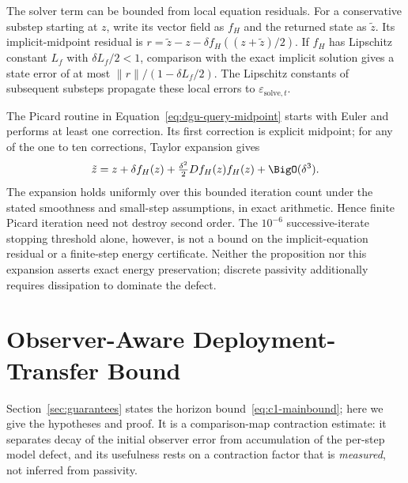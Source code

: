 The solver term can be bounded from local equation residuals. For a
conservative substep starting at $z$, write its vector field as $f_H$ and
the returned state as $\tilde z$. Its implicit-midpoint residual is
$r=\tilde z-z-\delta f_H((z+\tilde z)/2)$.
If $f_H$ has Lipschitz constant $L_f$ with $\delta L_f/2<1$, comparison
with the exact implicit solution gives a state error of at most
$\lVert r\rVert/(1-\delta L_f/2)$. The Lipschitz constants of subsequent
substeps propagate these local errors to $\varepsilon_{\mathrm{solve},t}$.

The Picard routine in Equation~\eqref{eq:dgu-query-midpoint} starts with
Euler and performs at least one correction. Its first correction is explicit
midpoint; for any of the one to ten corrections, Taylor expansion gives
\[
 \tilde z=z+\delta f_H(z)
       +\tfrac{\delta^2}{2}Df_H(z)f_H(z)+\BigO(\delta^3).
\]
The expansion holds uniformly over this bounded iteration count under the
stated smoothness and small-step assumptions, in exact arithmetic. Hence
finite Picard iteration need not destroy second order. The $10^{-6}$
successive-iterate stopping threshold alone, however, is not a bound on
the implicit-equation residual or a finite-step energy certificate.
Neither the proposition nor this expansion asserts exact energy preservation;
discrete passivity additionally requires dissipation to dominate the defect.

\section{Observer-Aware Deployment-Transfer Bound}
\label{app:transfer-bound}

Section~\ref{sec:guarantees} states the horizon bound~\eqref{eq:c1-mainbound}; here we give the hypotheses and proof. It is a comparison-map contraction estimate: it separates decay of the initial observer error from accumulation of the per-step model defect, and its usefulness rests on a contraction factor that is \emph{measured}, not inferred from passivity.

